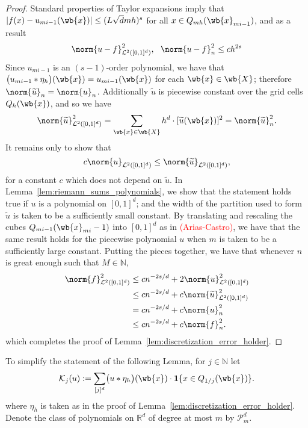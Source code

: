 \documentclass{article}
\newcommand{\Reals}{\mathbb{R}}
\newcommand{\abs}[1]{\left \lvert #1 \right \rvert}
\newcommand{\1}{\mathbf{1}}
\newcommand{\Leb}{\mathcal{L}}
\newcommand{\wt}[1]{\widetilde{#1}}
\theoremstyle{alden}
\theoremstyle{aldenthm}
\theoremstyle{definition}
\theoremstyle{remark}
\begin{document}
\begin{proof}
	Standard properties of Taylor expansions imply that $\abs{f(x) - u_{mi - 1}(\wb{x})} \leq (L\sqrt{d}mh)^{s}$ for all $x \in Q_{mh}(\wb{x}_{mi - 1})$, and as a result
	\begin{equation*}
	\norm{u - f}_{\Leb^2([0,1]^d)}^2,~~\norm{u - f}_{n}^2 \leq ch^{2s}
	\end{equation*}
	Since $u_{mi- 1}$ is an $(s - 1)$-order polynomial, we have that $\bigl(u_{mi - 1} \ast \eta_h\bigr)(\wb{x}) = u_{mi - 1}(\wb{x})$ for each $\wb{x} \in \wb{X}$; therefore $\norm{\wt{u}}_n = \norm{u}_n$.
	Additionally $\wt{u}$ is piecewise constant over the grid cells $Q_h(\wb{x})$, and so we have
	\begin{equation*}
	\norm{\wt{u}}_{\Leb^2([0,1]^d)}^2 = \sum_{\wb{x} \in \wb{X}} h^d \cdot  [\wt{u}(\wb{x})]^2 = \norm{\wt{u}}_n^2.
	\end{equation*}
	It remains only to show that
	\begin{equation*}
	c \norm{u}_{\Leb^2([0,1]^d)} \leq \norm{\wt{u}}_{\Leb^2([0,1]^d)},
	\end{equation*}
	for a constant $c$ which does not depend on $\wt{u}$. In Lemma~\ref{lem:riemann_sums_polynomials}, we show that the statement holds true if $u$ is a polynomial on $[0,1]^d$; and the width of the partition used to form $\wt{u}$ is taken to be a sufficiently small constant. By translating and rescaling the cubes $Q_{mi - 1}(\wb{x}_{mi} - 1)$ into $[0,1]^d$ as in \textcolor{red}{(Arias-Castro)}, we have that the same result holds for the piecewise polynomial $u$ when $m$ is taken to be a sufficiently large constant. Putting the pieces together, we have that whenever $n$ is great enough such that $M \in \mathbb{N}$, 
	\begin{align*}
	\norm{f}_{\Leb^2([0,1]^d)}^2 & \leq cn^{-2s/d} + 2\norm{u}_{\Leb^2([0,1]^d)}^2 \\ & \leq cn^{-2s/d} + c\norm{\wt{u}}_{\Leb^2([0,1]^d)}^2 \\
	& = cn^{-2s/d} + c\norm{u}_{n}^2 \\
	& \leq cn^{-2s/d} + c\norm{f}_n^2.
	\end{align*}
	which completes the proof of Lemma~\ref{lem:discretization_error_holder}.
\end{proof}

To simplify the statement of the following Lemma, for $j \in \mathbb{N}$ let
\begin{equation*}
\mathcal{K}_j(u) := \sum_{[j]^d} \bigl(u \ast \eta_h\bigr)(\wb{x}) \cdot \1\{x \in Q_{1/j}(\wb{x})\}.
\end{equation*}
where $\eta_h$ is taken as in the proof of Lemma~\ref{lem:discretization_error_holder}. Denote the class of polynomials on $\Reals^d$ of degree at most $m$ by $\mathcal{P}_m^d$.
\end{document}
